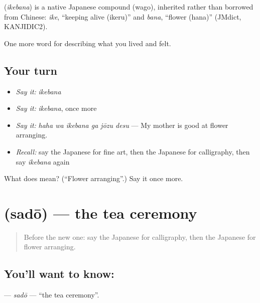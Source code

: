 \begin{cousinweb}
\textbf{} (\emph{ikebana}) is a native Japanese compound (wago), inherited rather than borrowed from Chinese: \emph{ike}, \textquotedblleft{}keeping alive (ikeru)\textquotedblright{} and \emph{bana}, \textquotedblleft{}flower (hana)\textquotedblright{} (JMdict, KANJIDIC2).
\end{cousinweb}

\begin{grammarlens}[title={What you've built}]
One more word for describing what you lived and felt.
\end{grammarlens}

\subsection*{Your turn}
\begin{itemize}
\raggedright
  \item \emph{Say it:} \emph{ikebana}
  \item \emph{Say it:} \emph{ikebana}, once more
  \item \emph{Say it:} \emph{haha wa ikebana ga jōzu desu} — My mother is good at flower arranging.
  \item \emph{Recall:} say the Japanese for fine art, then the Japanese for calligraphy, then say \emph{ikebana} again
\end{itemize}

\begin{tcolorbox}[breakable,colback=teal!4,colframe=teal!35!black,title={Before you move on}]
What does  mean? (\textquotedblleft{}Flower arranging\textquotedblright{}.) Say it once more.
\end{tcolorbox}
\section[\texorpdfstring{\ja{さどう} (sadō)}{さどう (sadō)}]{ (sadō) — the tea ceremony}

\label{lesson:JA-C466-sadou}



\begin{quote}
Before the new one: say the Japanese for calligraphy, then the Japanese for flower arranging.
\end{quote}

\subsection*{You'll want to know: }
\textbf{} — \emph{sadō} — \textquotedblleft{}the tea ceremony\textquotedblright{}.

